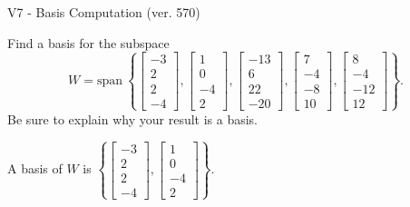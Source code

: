 \begin{exercise}
  \begin{exerciseTitle}V7 - Basis Computation (ver. 570)\end{exerciseTitle}
  \begin{exerciseStatement}
    Find a basis for the subspace 
\[W=\mathrm{span}\ \left\{\left[\begin{array}{r}
-3 \\
2 \\
2 \\
-4
\end{array}\right] , \left[\begin{array}{r}
1 \\
0 \\
-4 \\
2
\end{array}\right] , \left[\begin{array}{r}
-13 \\
6 \\
22 \\
-20
\end{array}\right] , \left[\begin{array}{r}
7 \\
-4 \\
-8 \\
10
\end{array}\right] , \left[\begin{array}{r}
8 \\
-4 \\
-12 \\
12
\end{array}\right]\right\}.\]
 Be sure to explain why your result is a basis.


  \end{exerciseStatement}
  \begin{exerciseAnswer}
   A basis of \(W\) is  \(\left\{\left[\begin{array}{r}
-3 \\
2 \\
2 \\
-4
\end{array}\right] , \left[\begin{array}{r}
1 \\
0 \\
-4 \\
2
\end{array}\right]\right\}\).
  


  \end{exerciseAnswer}
\end{exercise}